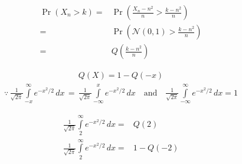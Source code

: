 \documentclass{beamer}
\providecommand{\pr}[1]{\ensuremath{\Pr\left(#1\right)}}
\providecommand{\brak}[1]{\ensuremath{\left(#1\right)}}
\begin{document}
\begin{frame}{}
\begin{block}{}
    \begin{align}
    \pr{X_n>k} =& \pr{\frac{X_n-n^2}{n}>\frac{k-n^2}{n}}
    \\=& \pr{\mathcal{N}\brak{0,1}>\frac{k-n^2}{n}}
    \\ =& Q\brak{\frac{k-n^2}{n}}
    \label{eq-cdf}
    \end{align}
\end{block}
\end{frame}

\begin{frame}{}
    \begin{block}{}
{\small
    \begin{align}
    Q\brak{X}=1-Q\brak{-x}
    \end{align}
    \begin{align*}
    \because \,{\frac{1}{\sqrt{2\pi}} \int \limits_{-x}^{\infty} e^{-x^2/2}\,dx}\,=\,{\frac{1}{\sqrt{2\pi}} \int \limits_{-\infty}^x e^{-x^2/2}\,dx}
    \quad \text{and} \quad \frac{1}{\sqrt{2\pi}} \int \limits_{-\infty}^{\infty} e^{-x^2/2}\,dx =1
    \end{align*}
}%
\end{block}

\begin{block}{}
    \begin{align}
    \frac{1}{\sqrt{2\pi}} \int \limits_2^{\infty} e^{-x^2/2}\,dx=& Q\brak{2}
    \\\frac{1}{\sqrt{2\pi}} \int \limits_2^{\infty} e^{-x^2/2}\,dx=&1-Q\brak{-2}
    \end{align}
\end{block}
\end{frame}
\end{document}
